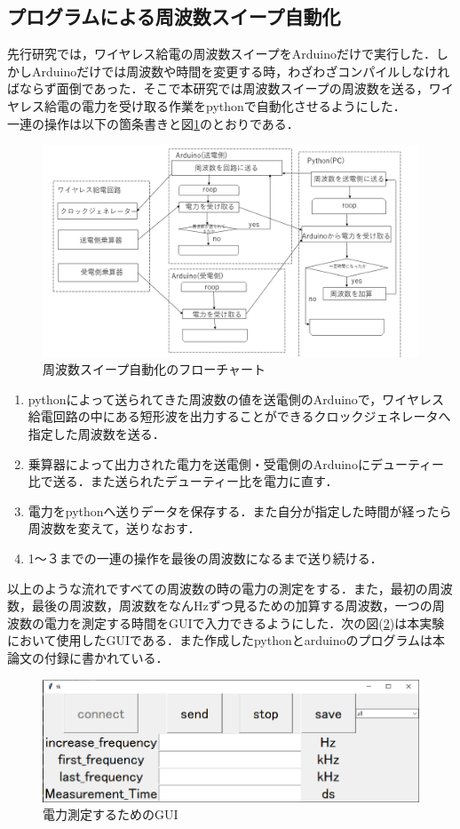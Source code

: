 \documentclass[12pt]{jarticle}
\begin{document}
\subsection{プログラムによる周波数スイープ自動化}
先行研究では，ワイヤレス給電の周波数スイープをArduinoだけで実行した．しかしArduinoだけでは周波数や時間を変更する時，わざわざコンパイルしなければならず面倒であった．そこで本研究では周波数スイープの周波数を送る，ワイヤレス給電の電力を受け取る作業をpythonで自動化させるようにした．\\
	一連の操作は以下の箇条書きと図\ref{fig:zidouka}のとおりである．
 \begin{figure}[H]
	\centering
	\includegraphics[scale=0.4]{huro.png}
	\caption{周波数スイープ自動化のフローチャート}
	\label{fig:zidouka}
\end{figure}
	\begin{enumerate}
		\item pythonによって送られてきた周波数の値を送電側のArduinoで，ワイヤレス給電回路の中にある短形波を出力することができるクロックジェネレータへ指定した周波数を送る．
		\item 乗算器によって出力された電力を送電側・受電側のArduinoにデューティー比で送る．また送られたデューティー比を電力に直す．
		\item 電力をpythonへ送りデータを保存する．また自分が指定した時間が経ったら周波数を変えて，送りなおす．
		\item 1～３までの一連の操作を最後の周波数になるまで送り続ける．
	\end{enumerate}
	以上のような流れですべての周波数の時の電力の測定をする．また，最初の周波数，最後の周波数，周波数をなんHzずつ見るための加算する周波数，一つの周波数の電力を測定する時間をGUIで入力できるようにした．次の図(\ref{fig:gui})は本実験において使用したGUIである．また作成したpythonとarduinoのプログラムは本論文の付録に書かれている．
 \begin{figure}[H]
	\centering
	\includegraphics[scale=0.5]{gui.png}
	\caption{電力測定するためのGUI}
	\label{fig:gui}
\end{figure}
\clearpage
\end{document}
